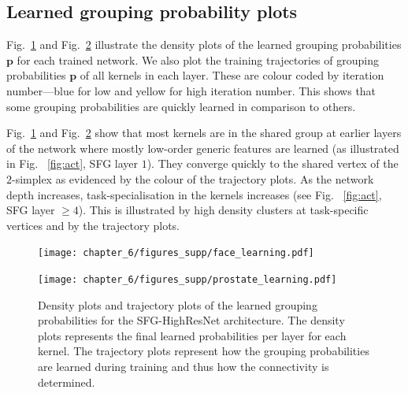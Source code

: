 \subsection{Learned grouping probability plots}
Fig.~\ref{fig:fig_learned_A} and Fig.~\ref{fig:fig_learned_B} illustrate the density plots of the learned grouping probabilities $\mathbf{p}$ for each trained network. We also plot the training trajectories of grouping probabilities $\mathbf{p}$ of all kernels in each layer. These are colour coded by iteration number---blue for low and yellow for high iteration number. This shows that some grouping probabilities are quickly learned in comparison to others. 

Fig.~\ref{fig:fig_learned_A} and Fig.~\ref{fig:fig_learned_B} show that most kernels are in the shared group at earlier layers of the network where mostly low-order generic features are learned (as illustrated in Fig.~ \ref{fig:act}, SFG layer $1$). They converge quickly to the shared vertex of the $2$-simplex as evidenced by the colour of the trajectory plots. As the network depth increases, task-specialisation in the kernels increases (see Fig.~ \ref{fig:act}, SFG layer $\ge4$). This is illustrated by high density clusters at task-specific vertices and by the trajectory plots.

\begin{figure}[ht!]
	\centering
	\texttt{[image: chapter\_6/figures\_supp/face\_learning.pdf]}
	\caption{\footnotesize {}}
	\label{fig:fig_learned_A}
\end{figure}

\begin{figure}[h]
	\centering
	\texttt{[image: chapter\_6/figures\_supp/prostate\_learning.pdf]}
	\caption{\footnotesize Density plots and trajectory plots of the learned grouping probabilities for the SFG-HighResNet architecture. The density plots represents the final learned probabilities per layer for each kernel. The trajectory plots represent how the grouping probabilities are learned during training and thus how the connectivity is determined.}
	\label{fig:fig_learned_B}
\end{figure}



